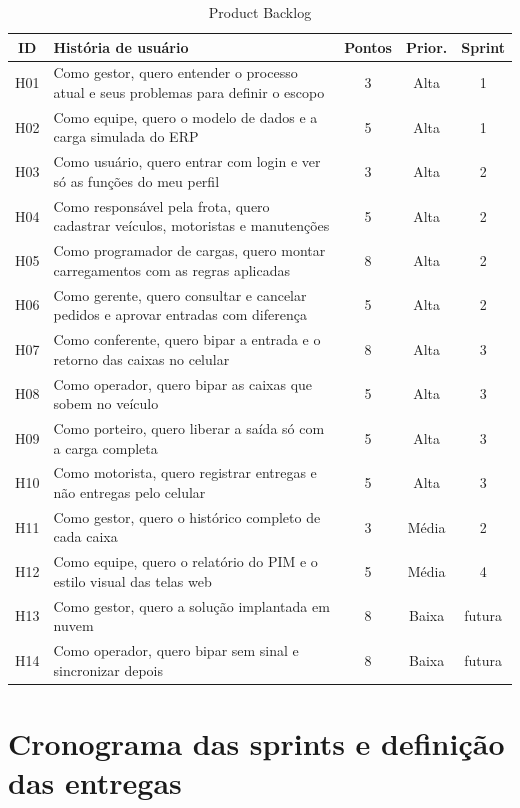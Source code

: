 \begin{table}[htbp]
\centering
\caption{Product Backlog}
\label{tab:backlog}
\footnotesize
\begin{tabular}{|c|p{9.4cm}|c|c|c|}
\hline
\textbf{ID} & \textbf{História de usuário} & \textbf{Pontos} & \textbf{Prior.} & \textbf{Sprint} \\ \hline
H01 & Como gestor, quero entender o processo atual e seus problemas para definir o escopo & 3 & Alta & 1 \\ \hline
H02 & Como equipe, quero o modelo de dados e a carga simulada do ERP & 5 & Alta & 1 \\ \hline
H03 & Como usuário, quero entrar com login e ver só as funções do meu perfil & 3 & Alta & 2 \\ \hline
H04 & Como responsável pela frota, quero cadastrar veículos, motoristas e manutenções & 5 & Alta & 2 \\ \hline
H05 & Como programador de cargas, quero montar carregamentos com as regras aplicadas & 8 & Alta & 2 \\ \hline
H06 & Como gerente, quero consultar e cancelar pedidos e aprovar entradas com diferença & 5 & Alta & 2 \\ \hline
H07 & Como conferente, quero bipar a entrada e o retorno das caixas no celular & 8 & Alta & 3 \\ \hline
H08 & Como operador, quero bipar as caixas que sobem no veículo & 5 & Alta & 3 \\ \hline
H09 & Como porteiro, quero liberar a saída só com a carga completa & 5 & Alta & 3 \\ \hline
H10 & Como motorista, quero registrar entregas e não entregas pelo celular & 5 & Alta & 3 \\ \hline
H11 & Como gestor, quero o histórico completo de cada caixa & 3 & Média & 2 \\ \hline
H12 & Como equipe, quero o relatório do PIM e o estilo visual das telas web & 5 & Média & 4 \\ \hline
H13 & Como gestor, quero a solução implantada em nuvem & 8 & Baixa & futura \\ \hline
H14 & Como operador, quero bipar sem sinal e sincronizar depois & 8 & Baixa & futura \\ \hline
\end{tabular}
\end{table}

\section{Cronograma das sprints e definição das entregas}

